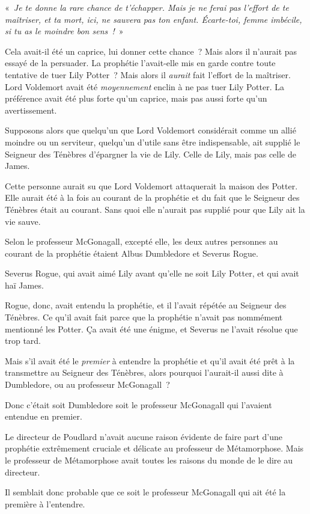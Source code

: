 «~\emph{Je te donne la rare chance de t'échapper.
Mais je ne ferai pas l'effort de te maîtriser, et ta mort, ici, ne sauvera pas ton enfant.
Écarte-toi, femme imbécile, si tu as le moindre bon sens~!}~»

Cela avait-il été un caprice, lui donner cette chance~?
Mais alors il n'aurait pas essayé de la persuader.
La prophétie l'avait-elle mis en garde contre toute tentative de tuer Lily Potter~?
Mais alors il \emph{aurait} fait l'effort de la maîtriser.
Lord Voldemort avait été \emph{moyennement} enclin à ne pas tuer Lily Potter.
La préférence avait été plus forte qu'un caprice, mais pas aussi forte qu'un avertissement.

Supposons alors que quelqu'un que Lord Voldemort considérait comme un allié moindre ou un serviteur, quelqu'un d'utile sans être indispensable, ait supplié le Seigneur des Ténèbres d'épargner la vie de Lily.
Celle de Lily, mais pas celle de James.

Cette personne aurait su que Lord Voldemort attaquerait la maison des Potter.
Elle aurait été à la fois au courant de la prophétie et du fait que le Seigneur des Ténèbres était au courant.
Sans quoi elle n'aurait pas supplié pour que Lily ait la vie sauve.

Selon le professeur McGonagall, excepté elle, les deux autres personnes au courant de la prophétie étaient Albus Dumbledore et Severus Rogue.

Severus Rogue, qui avait aimé Lily avant qu'elle ne soit Lily Potter, et qui avait haï James.

Rogue, donc, avait entendu la prophétie, et il l'avait répétée au Seigneur des Ténèbres.
Ce qu'il avait fait parce que la prophétie n'avait pas nommément mentionné les Potter.
Ça avait été une énigme, et Severus ne l'avait résolue que trop tard.

Mais s'il avait été le \emph{premier} à entendre la prophétie et qu'il avait été prêt à la transmettre au Seigneur des Ténèbres, alors pourquoi l'aurait-il aussi dite à Dumbledore, ou au professeur McGonagall~?

Donc c'était soit Dumbledore soit le professeur McGonagall qui l'avaient entendue en premier.

Le directeur de Poudlard n'avait aucune raison évidente de faire part d'une prophétie extrêmement cruciale et délicate au professeur de Métamorphose.
Mais le professeur de Métamorphose avait toutes les raisons du monde de le dire au directeur.

Il semblait donc probable que ce soit le professeur McGonagall qui ait été la première à l'entendre.

